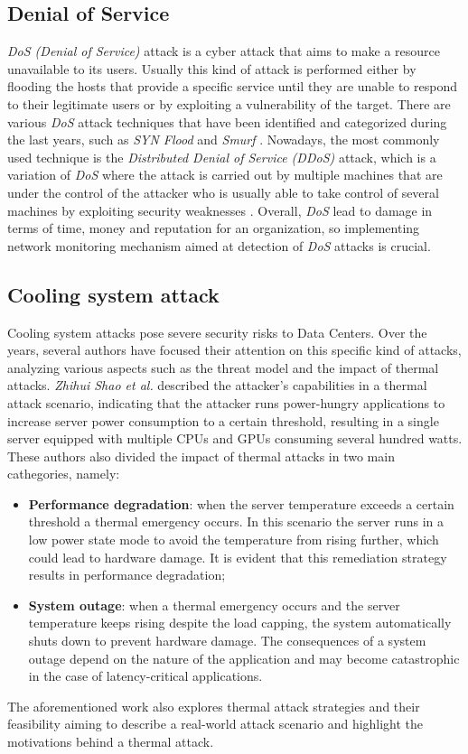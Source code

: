 \subsection{Denial of Service}
\emph{DoS (Denial of Service)} attack is a cyber attack that aims to make a resource unavailable to its users. Usually this kind of attack is performed either by flooding the hosts that provide a specific service until they are unable to respond to their legitimate users or by exploiting a vulnerability of the target. There are various \emph{DoS} attack techniques that have been identified and categorized during the last years, such as \emph{SYN Flood} and \emph{Smurf} \cite{understandingdos}. Nowadays, the most commonly used technique is the \emph{Distributed Denial of Service (DDoS)} attack, which is a variation of \emph{DoS} where the attack is carried out by multiple machines that are under the control of the attacker who is usually able to take control of several machines by exploiting security weaknesses \cite{understandingdos}. Overall, \emph{DoS} lead to damage in terms of time, money and reputation for an organization, so implementing network monitoring mechanism aimed at detection of \emph{DoS} attacks is crucial. 
\subsection{Cooling system attack}
Cooling system attacks pose severe security risks to Data Centers. Over the years, several authors have focused their attention on this specific kind of attacks, analyzing various aspects such as the threat model and the impact of thermal attacks. \emph{Zhihui Shao et al.} \cite{hiddenthreatthermalattacks} described the attacker's capabilities in a thermal attack scenario, indicating that the attacker runs power-hungry applications to increase server power consumption to a certain threshold, resulting in a single server equipped with multiple CPUs and GPUs consuming several hundred watts. These authors also divided the impact of thermal attacks in two main cathegories, namely:
\begin{itemize}
    \item \textbf{Performance degradation}: when the server temperature exceeds a certain threshold a thermal emergency occurs. In this scenario the server runs in a low power state mode to avoid the temperature from rising further, which could lead to hardware damage. It is evident that this remediation strategy results in performance degradation; 
    \item \textbf{System outage}: when a thermal emergency occurs and the server temperature keeps rising despite the load capping, the system automatically shuts down to prevent hardware damage. The consequences of a system outage depend on the nature of the application and may become catastrophic in the case of latency-critical applications.
\end{itemize}
The aforementioned work also explores thermal attack strategies and their feasibility aiming to describe a real-world attack scenario and highlight the motivations behind a thermal attack. 

